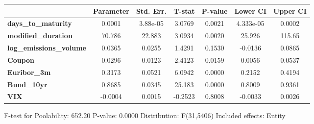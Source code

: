 \begin{center}
\begin{tabular}{lclc}
\bottomrule
\end{tabular}
\begin{tabular}{lcccccc}
                                & \textbf{Parameter} & \textbf{Std. Err.} & \textbf{T-stat} & \textbf{P-value} & \textbf{Lower CI} & \textbf{Upper CI}  \\
\midrule
\textbf{days\_to\_maturity}     &       0.0001       &      3.88e-05      &      3.0769     &      0.0021      &     4.333e-05     &       0.0002       \\
\textbf{modified\_duration}     &       70.786       &       22.883       &      3.0934     &      0.0020      &       25.926      &       115.65       \\
\textbf{log\_emissions\_volume} &       0.0365       &       0.0255       &      1.4291     &      0.1530      &      -0.0136      &       0.0865       \\
\textbf{Coupon}                 &       0.0296       &       0.0123       &      2.4123     &      0.0159      &       0.0056      &       0.0537       \\
\textbf{Euribor\_3m}            &       0.3173       &       0.0521       &      6.0942     &      0.0000      &       0.2152      &       0.4194       \\
\textbf{Bund\_10yr}             &       0.8685       &       0.0345       &      25.183     &      0.0000      &       0.8009      &       0.9361       \\
\textbf{VIX}                    &      -0.0004       &       0.0015       &     -0.2523     &      0.8008      &      -0.0033      &       0.0026       \\
\bottomrule
\end{tabular}
\end{center}

F-test for Poolability: 652.20 \newline
 P-value: 0.0000 \newline
 Distribution: F(31,5406) \newline
  \newline
 Included effects: Entity